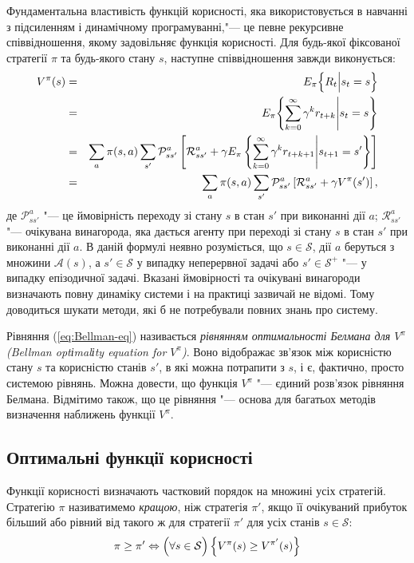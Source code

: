 \documentclass[a4paper,10pt,fleqn]{article}
\begin{document}
Фундаментальна властивість функцій корисності, яка використовується в навчанні з підсиленням і динамічному програмуванні,"--- це певне рекурсивне співвідношення, якому задовільняє функція корисності. Для будь-якої фіксованої стратегії $\pi$ та будь-якого стану $s$, наступне співвідношення завжди виконується:
\begin{eqnarray}
V^\pi(s) & = & E_\pi \Bigl\{R_t \Big| s_t = s \Bigr\} \nonumber\\
			& = & E_\pi \Biggl\{\sum_{k=0}^{\infty}\gamma^k r_{t+k} \Bigg| s_t = s \Biggr\} \nonumber\\
			& = & \sum_a \pi(s,a)\sum_{s'}\mathcal{P}^a_{ss'} \left[ \mathcal{R}^a_{ss'}+\gamma E_\pi \left\{\sum_{k=0}^{\infty}\gamma^k r_{t+k+1} \Bigg| s_{t+1} = s' \right\} \right] \nonumber\\
			& = & \sum_a \pi(s,a)\sum_{s'}\mathcal{P}^a_{ss'} \left[ \mathcal{R}^a_{ss'}+\gamma V^\pi(s') \right],
\label{eq:Bellman-eq}
\end{eqnarray}
де $\mathcal{P}^a_{ss'}$ "--- це ймовірність переходу зі стану $s$ в стан $s'$ при виконанні дії $a$; $\mathcal{R}^a_{ss'}$ "--- очікувана винагорода, яка дається агенту при переході зі стану $s$ в стан $s'$ при виконанні дії $a$. В даній формулі неявно розуміється, що $s \in \mathcal{S}$, дії $a$ беруться з множини $\mathcal{A}(s)$, а $s' \in \mathcal{S}$ у випадку неперервної задачі або $s' \in \mathcal{S^+}$ "--- у випадку епізодичної задачі. Вказані ймовірності та очікувані винагороди визначають повну динаміку системи і на практиці зазвичай не відомі. Тому доводиться шукати методи, які б не потребували повних знань про систему.

Рівняння (\ref{eq:Bellman-eq}) називається \emph{рівнянням оптимальності Белмана для $V^\pi$ (Bellman optіmalіty equation for $V^\pi$)}. Воно відображає зв'язок між корисністю стану $s$ та корисністю станів $s'$, в які можна потрапити з $s$, і є, фактично, просто системою рівнянь. Можна довести, що функція $V^\pi$ "--- єдиний розв'язок рівняння Белмана. Відмітимо також, що це рівняння "--- основа для багатьох методів визначення наближень функції $V^\pi$.

\subsection{Оптимальні функції корисності}

Функції корисності визначають частковий порядок на множині усіх стратегій. Стратегію $\pi$ називатимемо \emph{кращою}, ніж стратегія $\pi '$, якщо її очікуваний прибуток більший або рівний від такого ж для стратегії $\pi '$ для усіх станів $s \in \mathcal{S}$:
\begin{equation}
\pi \geq \pi ' \Leftrightarrow \Bigl(\forall s \in \mathcal{S}\Bigr)\left\{ V^\pi(s) \geq V^{\pi '}(s) \right\}
\end{equation}
\end{document}
